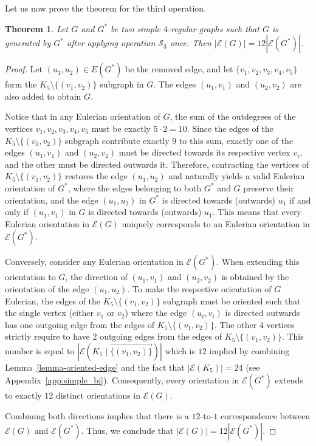\documentclass{article}
\newtheorem{theorem}{Theorem}
\begin{document}
        Let us now prove the theorem for the third operation.
        \begin{theorem}
            Let $G$ and $G^*$ be two simple $4$-regular graphs such that $G$ is generated by $G^*$ after applying  operation $\mathcal{S}_3$ once. Then $|\mathcal{E}(G)|=12|\mathcal{E}(G^*)|$.
        \end{theorem}
        
        \begin{proof}
            Let $(u_1,u_2) \in E(G^*)$ be the removed edge, and let $\{v_1, v_2, v_3, v_4,v
            _5\}$ form the $K_5\setminus\{(v_1,v_2)\}$ subgraph in $G$. 
            The edges $(u_1,v_1)$ and $(u_2,v_2)$ are also added to obtain $G$.
            
            Notice that in any Eulerian orientation of $G$, the sum of the outdegrees of the vertices $v_1, v_2, v_3, v_4,v_5$  must be exactly $5 \cdot 2 = 10$. 
            Since the edges of the $K_5 \setminus \{(v_1,v_2)\}$ subgraph contribute exactly $9$ to this sum, exactly one of the edges $(u_1, v_1)$ and $(u_2, v_2)$ must be directed towards its respective vertex $v_i$, and the other must be directed outwards it.
            Therefore, contracting the vertices of $K_5 \setminus \{(v_1,v_2)\}$ restores the edge $(u_1,u_2)$ and naturally yields a valid Eulerian orientation of $G^*$, where the edges belonging to both $G^*$ and $G$ preserve their orientation, and the edge $(u_1,u_2)$ in $G^*$ is directed towards (outwards) $u_1$ if and only if $(u_1,v_1)$ in $G$ is directed towards (outwards) $u_1$.
            This means that every Eulerian orientation in $\mathcal{E}(G)$ uniquely corresponds to an Eulerian orientation in $\mathcal{E}(G^*)$.
            
            Conversely, consider any Eulerian orientation in $\mathcal{E}(G^*)$.
            When extending this orientation to $G$, the direction of $(u_1, v_1)$ and $(u_2,v_2)$ is obtained by the orientation of the edge $(u_1,u_2)$. 
            To make the respective orientation of $G$ Eulerian, the edges of the $K_5 \setminus \{(v_1,v_2)\}$ subgraph must be oriented such that the single vertex (either $v_1$ or $v_2$) where the  edge $(u_i,v_i)$  is directed outwards has one outgoing edge from the edges of $K_5 \setminus \{(v_1,v_2)\}$. The other $4$ vertices strictly require to have $2$ outgoing edges from the edges of $K_5 \setminus \{(v_1,v_2)\}$.
            This number is equal to $|\mathcal{E}(K_5 \mid \overrightarrow{\{(v_1,v_2)\}})|$ which is $12$ implied by combining Lemma~\ref{lemma-oriented-edge} and the fact that $|\mathcal{E}(K_5)|=24$ (see Appendix~\ref{app:simple_bi}). 
            Consequently, every orientation in $\mathcal{E}(G^*)$ extends to exactly $12$ distinct orientations in $\mathcal{E}(G)$.
            
            Combining both directions implies that there is a $12$-to-$1$ correspondence between $\mathcal{E}(G)$ and $\mathcal{E}(G^*)$.
            Thus, we conclude that $|\mathcal{E}(G)| = 12|\mathcal{E}(G^*)|$.
        
        \end{proof}
\end{document}
